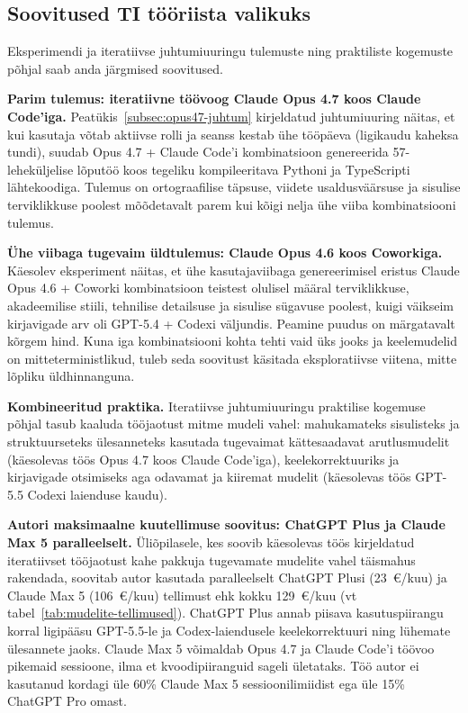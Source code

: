\subsection{Soovitused TI tööriista valikuks} \label{subsec:soovitused}

Eksperimendi ja iteratiivse juhtumiuuringu tulemuste ning praktiliste kogemuste põhjal saab anda järgmised soovitused.

\textbf{Parim tulemus: iteratiivne töövoog Claude Opus 4.7 koos Claude Code'iga.} Peatükis~\ref{subsec:opus47-juhtum} kirjeldatud juhtumiuuring näitas, et kui kasutaja võtab aktiivse rolli ja seanss kestab ühe tööpäeva (ligikaudu kaheksa tundi), suudab Opus 4.7 + Claude Code'i kombinatsioon genereerida 57-leheküljelise lõputöö koos tegeliku kompileeritava Pythoni ja TypeScripti lähtekoodiga. Tulemus on ortograafilise täpsuse, viidete usaldusväärsuse ja sisulise terviklikkuse poolest mõõdetavalt parem kui kõigi nelja ühe viiba kombinatsiooni tulemus.

\textbf{Ühe viibaga tugevaim üldtulemus: Claude Opus 4.6 koos Coworkiga.} Käesolev eksperiment näitas, et ühe kasutajaviibaga genereerimisel eristus Claude Opus 4.6 + Coworki kombinatsioon teistest olulisel määral terviklikkuse, akadeemilise stiili, tehnilise detailsuse ja sisulise sügavuse poolest, kuigi väikseim kirjavigade arv oli GPT-5.4 + Codexi väljundis. Peamine puudus on märgatavalt kõrgem hind. Kuna iga kombinatsiooni kohta tehti vaid üks jooks ja keelemudelid on mitteterministlikud, tuleb seda soovitust käsitada eksploratiivse viitena, mitte lõpliku üldhinnanguna.

\textbf{Kombineeritud praktika.} Iteratiivse juhtumiuuringu praktilise kogemuse põhjal tasub kaaluda tööjaotust mitme mudeli vahel: mahukamateks sisulisteks ja struktuurseteks ülesanneteks kasutada tugevaimat kättesaadavat arutlusmudelit (käesolevas töös Opus 4.7 koos Claude Code'iga), keelekorrektuuriks ja kirjavigade otsimiseks aga odavamat ja kiiremat mudelit (käesolevas töös GPT-5.5 Codexi laienduse kaudu).

\textbf{Autori maksimaalne kuutellimuse soovitus: ChatGPT Plus ja Claude Max 5\texttimes{} paralleelselt.} Üliõpilasele, kes soovib käesolevas töös kirjeldatud iteratiivset tööjaotust kahe pakkuja tugevamate mudelite vahel täismahus rakendada, soovitab autor kasutada paralleelselt ChatGPT Plusi (23~€/kuu) ja Claude Max 5\texttimes{} (106~€/kuu) tellimust ehk kokku 129~€/kuu (vt tabel~\ref{tab:mudelite-tellimused}). ChatGPT Plus annab piisava kasutuspiirangu korral ligipääsu GPT-5.5-le ja Codex-laiendusele keelekorrektuuri ning lühemate ülesannete jaoks. Claude Max 5\texttimes{} võimaldab Opus 4.7 ja Claude Code'i töövoo pikemaid sessioone, ilma et kvoodipiiranguid sageli ületataks. Töö autor ei kasutanud kordagi üle 60\% Claude Max 5\texttimes{} sessioonilimiidist ega üle 15\% ChatGPT Pro omast.

